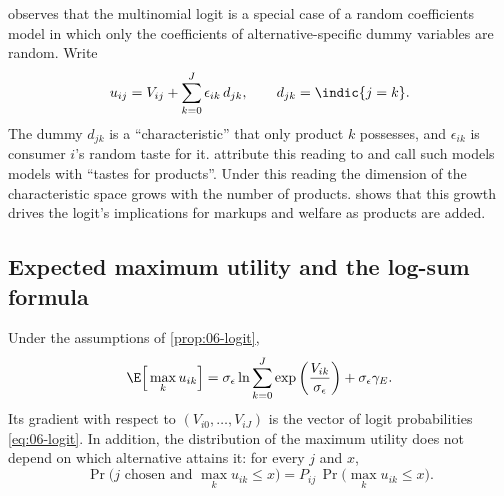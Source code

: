 \begin{remark}\label{rem:06-tastesforproducts}
\citet[p.~1412]{McFadden1984} observes that the multinomial logit is a special case of a random coefficients
model in which only the coefficients of alternative-specific dummy variables are random. Write
\begin{equation*}
u_{ij} = V_{ij} + \sum_{k=0}^J \epsilon_{ik}\,d_{jk}, \qquad d_{jk} = \indic\{j = k\}.
\end{equation*}
The dummy $d_{jk}$ is a ``characteristic'' that only product $k$ possesses, and $\epsilon_{ik}$ is consumer $i$'s
random taste for it. \citet{BerryPakes2007} attribute this reading to \citet{CaplinNalebuff1991} and call such
models models with ``tastes for products''. Under this reading the dimension of the characteristic space grows
with the number of products.  shows that this growth drives the logit's implications for
markups and welfare as products are added.
\end{remark}

\subsection{Expected maximum utility and the log-sum formula}\label{sec:06-logsum}

\begin{proposition}\label{prop:06-logsum}
Under the assumptions of \cref{prop:06-logit},
\begin{equation}\label{eq:06-logsum}
\E\Big[\max_k u_{ik}\Big] = \sigma_\epsilon\ln\sum_{k=0}^J\exp\left(\frac{V_{ik}}{\sigma_\epsilon}\right) + \sigma_\epsilon\gamma_E .
\end{equation}
Its gradient with respect to $(V_{i0}, \dots, V_{iJ})$ is the vector of logit probabilities
\eqref{eq:06-logit}. In addition, the distribution of the maximum utility does not depend on which alternative
attains it: for every $j$ and $x$,
\begin{equation}\label{eq:06-maxindep}
\Pr\Big(j \text{ chosen and } \max_k u_{ik} \le x\Big) = P_{ij}\,\Pr\Big(\max_k u_{ik} \le x\Big).
\end{equation}
\end{proposition}

